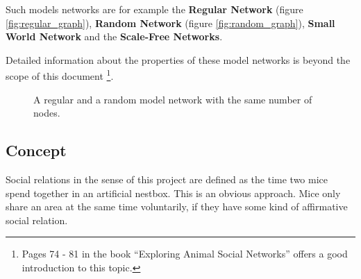 Such models networks are for example the \textbf{Regular Network} (figure \ref{fig:regular_graph}), \textbf{Random Network} (figure \ref{fig:random_graph}), \textbf{Small World Network} and the \textbf{Scale-Free Networks}.

Detailed information about the properties of these model networks is beyond the scope of this document \footnote{Pages 74 - 81 in the book ``Exploring Animal Social Networks''\cite{croft:07} offers a good introduction to this topic.}.

\begin{figure}[htpb]%
	\centering 
	\qquad 
	\caption{A regular  and a random  model network with the same number of nodes.} 
	 
\end{figure} 

\subsection{Concept}
\label{subsec:graph_concept}

Social relations in the sense of this project are defined as the time two mice spend together in an artificial nestbox. This is an obvious approach. Mice only share an area at the same time voluntarily, if they have some kind of affirmative social relation.

